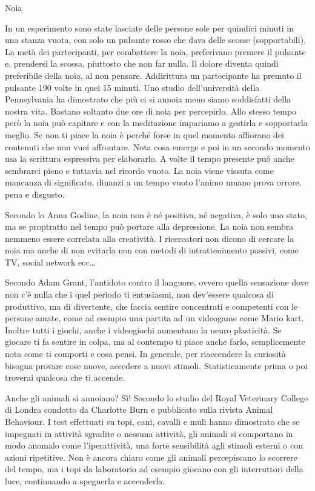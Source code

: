 \documentclass[12pt]{book} %
\begin{document}
\begin{mdframed}[linewidth=1pt]
Noia

In un esperimento sono state lasciate delle persone sole per quindici minuti in una stanza vuota, con solo un pulsante
rosso che dava delle scosse (sopportabili). La metà dei partecipanti, per combattere la noia, preferivano premere il
pulsante e, prendersi la scossa, piuttosto che non far nulla. Il dolore diventa quindi preferibile della noia, al non
pensare. Addirittura un partecipante ha premuto il pulsante 190 volte in quei 15
minuti. Uno studio dell'università della Pennsylvania
ha dimostrato che più ci si annoia meno siamo soddisfatti della nostra vita. Bastano soltanto due ore di noia per
percepirlo. Allo stesso tempo però la noia può capitare e con la meditazione impariamo a gestirla e sopportarla meglio.
Se non ti piace la noia è perché forse in quel momento affiorano dei contenuti che non vuoi affrontare. Nota cosa emerge e poi in un secondo momento usa la scrittura espressiva  per elaborarlo.
A volte il tempo presente può anche sembrarci pieno e tuttavia nel ricordo vuoto. La noia viene vissuta come mancanza
di significato, dinanzi a un tempo vuoto l'animo umano prova orrore, pena e disgusto.

Secondo lo Anna Gosline, la noia non è né positiva, né negativa, è solo uno stato, ma se proptratto nel tempo può portare alla depressione. La noia non sembra nemmeno essere correlata alla creatività. 
I ricercatori non dicono di cercare la noia ma anche di non evitarla non con metodi di intrattenimento passivi, come TV, social network ecc…

Secondo Adam Grant, l'antidoto contro il languore, ovvero quella sensazione dove non c'è nulla che i quel periodo ti
entusiasmi, non dev'essere qualcosa di produttivo, ma di divertente, che faccia sentire concentrati e competenti con le
persone amate, come ad esempio una partita ad un videogame come Mario
kart. Inoltre tutti i giochi, anche i videogiochi aumentano la neuro plasticità. Se giocare ti fa sentire in colpa, ma al
contempo ti piace anche farlo, semplicemente nota come ti comporti e cosa pensi. In generale, per riaccendere la curiosità bisogna provare cose nuove, accedere a nuovi stimoli. Statisticamente prima o poi troverai qualcosa che ti accende.

Anche gli animali si annoiano? Sì! Secondo lo studio del Royal Veterinary College di Londra condotto da Charlotte Burn e
pubblicato sulla rivista Animal Behaviour. I test effettuati su topi, cani, cavalli e muli hanno dimostrato che se
impegnati in attività sgradite o nessuna attività, gli animali si comportano in modo anomalo come l'iperattività, una
forte sensibilità agli stimoli esterni o con azioni ripetitive. Non è ancora chiaro come gli animali percepiscano lo
scorrere del tempo, ma i topi da laboratorio ad esempio giocano con gli interruttori della luce, continuando a
spegnerla e accenderla. 
\end{mdframed}
\end{document}
